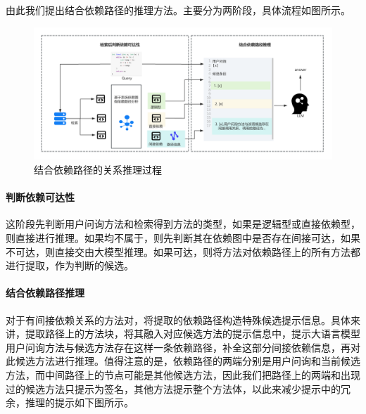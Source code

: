 由此我们提出结合依赖路径的推理方法。主要分为两阶段，具体流程如图所示。

\begin{figure}[h]
\centering
\includegraphics[width = 1\textwidth]{figures/结合依赖路径.jpg}
\caption{结合依赖路径的关系推理过程}
\end{figure}


\paragraph{判断依赖可达性} 这阶段先判断用户问询方法和检索得到方法的类型，如果是逻辑型或直接依赖型，则直接进行推理。如果均不属于，则先判断其在依赖图中是否存在间接可达，如果不可达，则直接交由大模型推理。如果可达，则将方法对依赖路径上的所有方法都进行提取，作为判断的候选。

\paragraph{结合依赖路径推理} 对于有间接依赖关系的方法对，将提取的依赖路径构造特殊候选提示信息。具体来讲，提取路径上的方法块，将其融入对应候选方法的提示信息中，提示大语言模型用户问询方法与候选方法存在这样一条依赖路径，补全这部分间接依赖信息，再对此候选方法进行推理。值得注意的是，依赖路径的两端分别是用户问询和当前候选方法，而中间路径上的节点可能是其他候选方法，因此我们把路径上的两端和出现过的候选方法只提示为签名，其他方法提示整个方法体，以此来减少提示中的冗余，推理的提示如下图所示。

